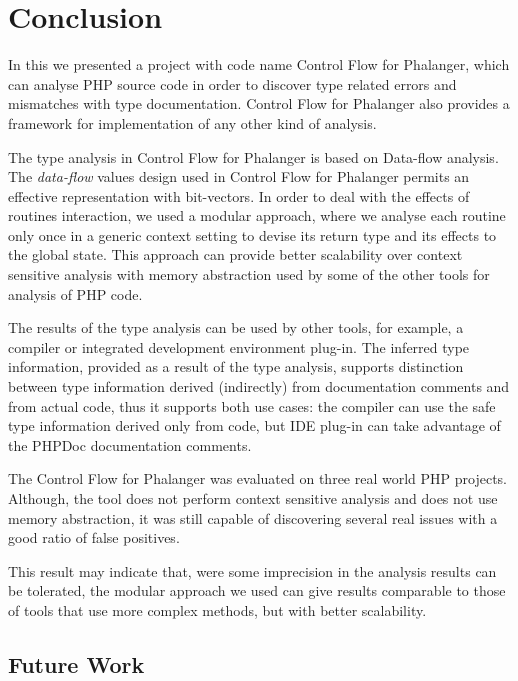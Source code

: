 \chapter{Conclusion}

    In this \wthesis{} we presented a project with code name 
    Control Flow for Phalanger, which can analyse PHP 
    source code in order to discover type related errors 
    and mismatches with type documentation. Control Flow 
    for Phalanger also provides a framework for 
    implementation of any other kind of analysis.
    
    The type analysis in Control Flow for Phalanger 
    is based on Data-flow analysis. The \emph{data-flow} 
    values design used in Control Flow for Phalanger 
    permits an effective representation with bit-vectors.
    In order to deal with the effects of routines 
    interaction, we used a modular approach, where 
    we analyse each routine only once in a generic 
    context setting to devise its return type and its 
    effects to the global state. This approach 
    can provide better scalability over 
    context sensitive analysis with memory 
    abstraction used by some of the other tools 
    for analysis of PHP code.
    
    The results of the type analysis can be used 
    by other tools, for example, a compiler or 
    integrated development environment plug-in. 
    The inferred type information, provided as 
    a result of the type analysis, supports 
    distinction between type information derived 
    (indirectly) from documentation comments and 
    from actual code, thus it supports both 
    use cases: the compiler can use the safe 
    type information derived only from code, 
    but IDE plug-in can take advantage of the 
    PHPDoc documentation comments.
    
    The Control Flow for Phalanger was evaluated on 
    three real world PHP projects. Although, the tool 
    does not perform context sensitive analysis and 
    does not use memory abstraction, it was still 
    capable of discovering several real issues with 
    a good ratio of false positives.
    
    This result may indicate that, were some imprecision 
    in the analysis results can be tolerated, the 
    modular approach we used can give results comparable 
    to those of tools that use more complex methods, 
    but with better scalability.

    \section{Future Work}
    

